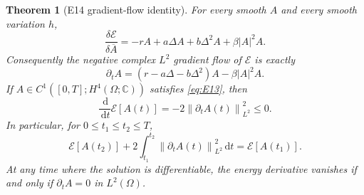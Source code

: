 \documentclass[11pt]{article}
\numberwithin{equation}{section}
\newtheorem{theorem}{Theorem}
\newcommand{\E}{\mathcal E}
\newcommand{\Om}{\Omega}
\newcommand{\dd}{\,\mathrm d}
\newcommand{\norm}[1]{\left\lVert #1\right\rVert}
\begin{document}
\begin{theorem}[E14 gradient-flow identity]\label{thm:main}
For every smooth $A$ and every smooth variation $h$,
\begin{equation}\label{eq:var}
\boxed{\displaystyle
\frac{\delta\E}{\delta\overline A}
=-rA+a\Delta A+b\Delta^2A+\beta|A|^2A.}
\end{equation}
Consequently the negative complex $L^2$ gradient flow of
$\E$ is exactly
\begin{equation}\label{eq:E13}
\boxed{\displaystyle
\partial_t A=(r-a\Delta-b\Delta^2)A-\beta|A|^2A.}
\end{equation}
If $A\in C^1([0,T];H^4(\Om;\mathbb C))$ satisfies
\eqref{eq:E13}, then
\begin{equation}\label{eq:diss}
\boxed{\displaystyle
\frac{\dd}{\dd t}\E[A(t)]
=-2\norm{\partial_t A(t)}_{L^2}^2\le0.}
\end{equation}
In particular, for $0\le t_1\le t_2\le T$,
\begin{equation}\label{eq:integrated}
\boxed{\displaystyle
\E[A(t_2)]+2\int_{t_1}^{t_2}
\norm{\partial_t A(t)}_{L^2}^2\dd t
=\E[A(t_1)].}
\end{equation}
At any time where the solution is differentiable,
the energy derivative vanishes if and only if
$\partial_t A=0$ in $L^2(\Om)$.
\end{theorem}
\end{document}
